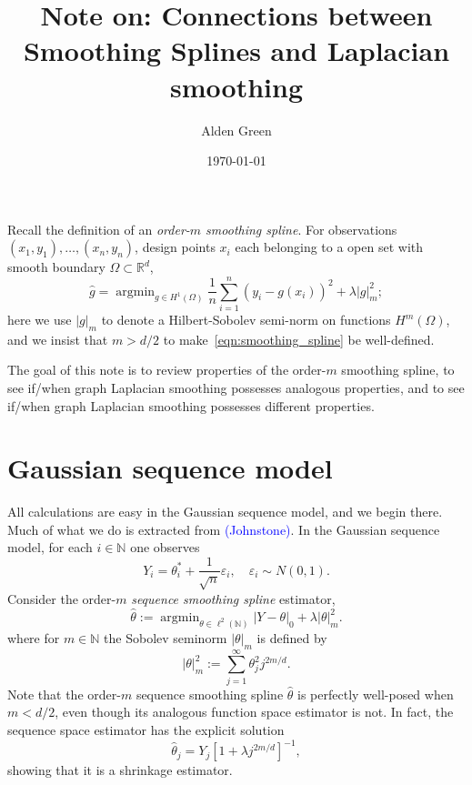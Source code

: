 \documentclass{article}
\newcommand{\Reals}{\mathbb{R}}
\newcommand{\1}{\mathbf{1}}
\DeclareMathOperator*{\argmin}{argmin}
\newcommand{\Rd}{\Reals^d}
\newcommand{\wh}[1]{\widehat{#1}}
\theoremstyle{alden}
\theoremstyle{aldenthm}
\theoremstyle{definition}
\theoremstyle{remark}
\begin{document}
\title{Note on: Connections between Smoothing Splines and Laplacian smoothing}
\author{Alden Green}
\date{\today}
\maketitle

Recall the definition of an \emph{order-$m$ smoothing spline}. For observations $(x_1,y_1),\ldots,(x_n,y_n)$, design points $x_i$ each belonging to a open set with smooth boundary $\Omega \subset \Rd$, 
\begin{equation}
\label{eqn:smoothing_spline}
\wh{g} = \argmin_{g \in H^1(\Omega)} \frac{1}{n} \sum_{i = 1}^{n} (y_i - g(x_i))^2 + \lambda |g|_{m}^2;
\end{equation}
here we use $|g|_{m}$ to denote a Hilbert-Sobolev semi-norm on functions $H^m(\Omega)$, and we insist that $m > d/2$ to make~\eqref{eqn:smoothing_spline} be well-defined. 

The goal of this note is to review properties of the order-$m$ smoothing spline, to see if/when graph Laplacian smoothing possesses analogous properties, and to see if/when graph Laplacian smoothing possesses different properties. 

\section{Gaussian sequence model}
All calculations are easy in the Gaussian sequence model, and we begin there. Much of what we do is extracted from \textcolor{blue}{(Johnstone)}. In the Gaussian sequence model, for each $i \in \mathbb{N}$ one observes
\begin{equation}
\label{model:gaussian_sequence_model}
Y_i = \theta_i^{\ast} + \frac{1}{\sqrt{n}}\varepsilon_i,\quad \varepsilon_i \sim N(0,1).
\end{equation}
Consider the order-$m$ \emph{sequence smoothing spline} estimator,
\begin{equation}
\label{eqn:sequence_smoothing_spline}
\wh{\theta} := \argmin_{\theta \in \ell^2(\mathbb{N})} |Y - \theta|_{0} + \lambda |\theta|_m^2.
\end{equation}
where for $m \in \mathbb{N}$ the Sobolev seminorm $|\theta|_m$ is defined by
\begin{equation*}
|\theta|_m^2 := \sum_{j = 1}^{\infty} \theta_j^2 j^{2m/d}.
\end{equation*}
Note that the order-$m$ sequence smoothing spline $\wh{\theta}$ is perfectly well-posed when $m < d/2$, even though its analogous function space estimator is not. In fact, the sequence space estimator has the explicit solution
\begin{equation}
\wh{\theta}_{j} = Y_j[1 + \lambda j^{2m/d}]^{-1},
\end{equation}
showing that it is a shrinkage estimator.
\end{document}
